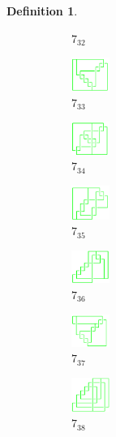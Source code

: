 \documentclass{article}
\theoremstyle{definition}
\newtheorem{defn}[thm]{Definition}
\theoremstyle{theorem}
\theoremstyle{proposition}
\theoremstyle{corollary}
\begin{document}
\begin{defn}
\begin{figure}[H]
\begin{subfigure}{0.075\textwidth}
    \caption{$7_{32}$} 
    \end{subfigure}
    \begin{subfigure}{0.075\textwidth}
    \includegraphics[width=1.25cm]{../Midterm_Poster/grid_diagram/theta_7_33.png}
    \caption{$7_{33}$} 
    \end{subfigure}
    \begin{subfigure}{0.075\textwidth}
    \includegraphics[width=1.25cm]{../Midterm_Poster/grid_diagram/theta_7_34.png}
    \caption{$7_{34}$} 
    \end{subfigure}
    \begin{subfigure}{0.075\textwidth}
    \includegraphics[width=1.25cm]{../Midterm_Poster/grid_diagram/theta_7_35.png}
    \caption{$7_{35}$} 
    \end{subfigure}
    \begin{subfigure}{0.075\textwidth}
    \includegraphics[width=1.25cm]{../Midterm_Poster/grid_diagram/theta_7_36.png}
    \caption{$7_{36}$} 
    \end{subfigure}
    \begin{subfigure}{0.075\textwidth}
    \includegraphics[width=1.25cm]{../Midterm_Poster/grid_diagram/theta_7_37.png}
    \caption{$7_{37}$} 
    \end{subfigure}
    \begin{subfigure}{0.075\textwidth}
    \includegraphics[width=1.25cm]{../Midterm_Poster/grid_diagram/theta_7_38.png}
    \caption{$7_{38}$} 
    \end{subfigure}
    \begin{subfigure}{0.075\textwidth}

\end{subfigure}
\end{figure}
\end{defn}
\end{document}
